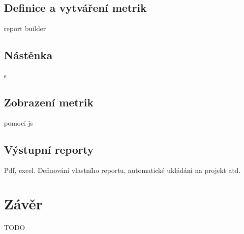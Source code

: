 \documentclass[czech,master,public,dept460,male,cpdeclaration,oneside]{diploma}
\begin{document}
\subsection{Definice a vytváření metrik}
report builder


\subsection{Nástěnka}
s

\subsection{Zobrazení metrik}
pomocí js


\subsection{Výstupní reporty}
Pdf, excel. Definování vlastního reportu, automatické ukládáni na projekt atd.
 

\section{Závěr}
TODO 
\end{document}
